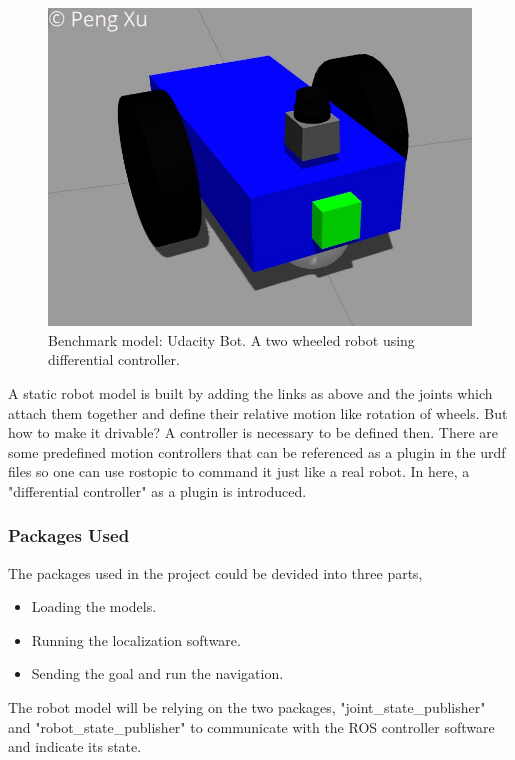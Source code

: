 \documentclass[10pt,journal,compsoc]{IEEEtran}
\begin{document}
\begin{figure}[thpb]
    \centering
    \includegraphics[width=\linewidth]{images/udacity-bot.png}
    \caption{Benchmark model: Udacity Bot. A two wheeled robot using differential controller.}
    \label{fig:udacity-bot}
\end{figure}

A static robot model is built by adding the links as above and the joints which attach them together and define their relative motion like rotation of wheels. But how to make it drivable? A controller is necessary to be defined then. There are some predefined motion controllers that can be referenced as a plugin in the urdf files so one can use rostopic to command it just like a real robot. In here, a "differential controller" as a plugin is introduced.

\subsubsection{Packages Used}

The packages used in the project could be devided into three parts,

\begin{itemize}
    \item Loading the models.
    \item Running the localization software.
    \item Sending the goal and run the navigation.
\end{itemize}

The robot model will be relying on the two packages, "joint\_state\_publisher" and "robot\_state\_publisher" to communicate with the ROS controller software and indicate its state.
\end{document}
